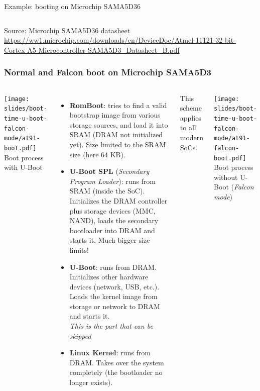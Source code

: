 \begin{frame}{Example: booting on Microchip SAMA5D36}
\begin{columns}
  \end{columns}
  \tiny Source: Microchip SAMA5D36 datasheet\\
  \url{https://ww1.microchip.com/downloads/en/DeviceDoc/Atmel-11121-32-bit-Cortex-A5-Microcontroller-SAMA5D3_Datasheet_B.pdf}
\end{frame}

\begin{frame}
  \frametitle{Normal and Falcon boot on Microchip SAMA5D3}
  \begin{columns}
    \begin{center}
    \texttt{[image: slides/boot-time-u-boot-falcon-mode/at91-boot.pdf]}\\
    \vspace{0.5cm}
    \tiny Boot process with U-Boot
    \end{center}
    \footnotesize
    \begin{itemize}
    \item {\bf RomBoot}: tries to find a valid bootstrap image from
      various storage sources, and load it into SRAM (DRAM not
      initialized yet). Size limited to the SRAM size (here 64 KB).
    \item {\bf U-Boot SPL} ({\em Secondary Program Loader}):
       runs from SRAM (inside the SoC). Initializes the DRAM
       controller plus storage devices (MMC, NAND), loads the
       secondary bootloader into DRAM and starts it. Much bigger
       size limits!
    \item {\bf U-Boot}: runs from DRAM. Initializes other hardware
      devices (network, USB, etc.). Loads the kernel image from
      storage or network to DRAM and starts it.\\
      {\em This is the part that can be skipped}
    \item {\bf Linux Kernel}: runs from DRAM. Takes over the system
      completely (the bootloader no longer exists).
    \end{itemize}
    This scheme applies to all modern SoCs.
    \vspace{1cm}
    \begin{center}
    \texttt{[image: slides/boot-time-u-boot-falcon-mode/at91-falcon-boot.pdf]}\\
    \vspace{0.5cm}
    \tiny Boot process without U-Boot ({\em Falcon mode})
    \end{center}
  \end{columns}
\end{frame}


